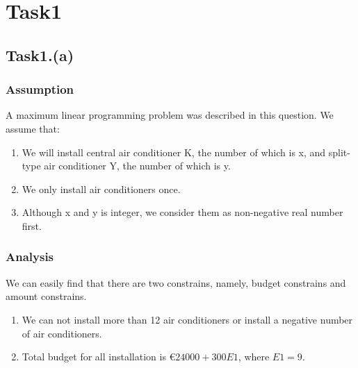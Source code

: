\documentclass[titlepage,a4paper]{article}
\begin{document}
\fi

\section{Task1}
    \subsection{Task1.(a)}
        \subsubsection{Assumption}
            A maximum linear programming problem was described in this question. We assume that:\\
            \begin{enumerate}
                \item We will install central air conditioner K, the number of which is x, and split-type air conditioner Y, the number of which is y. 
                \item We only install air conditioners once.
                \item Although x and y is integer, we consider them as non-negative real number first.
            \end{enumerate}
    
        \subsubsection{Analysis}
            We can easily find that there are two constrains, namely, budget constrains and amount constrains. \\
            \begin{enumerate}
                \item We can not install more than 12 air conditioners or install a negative number of air conditioners. 
                \item Total budget for all installation is \euro $24000 + 300E1$, where $E1 = 9$.
            \end{enumerate}
            
\end{document}
